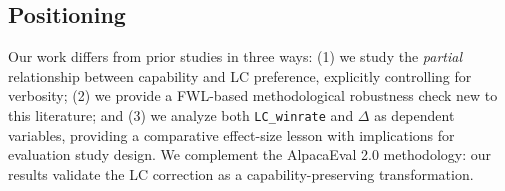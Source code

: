 \subsection{Positioning}

Our work differs from prior studies in three ways: (1) we study the \textit{partial}
relationship between capability and LC preference, explicitly controlling for verbosity;
(2) we provide a FWL-based methodological robustness check new to this literature; and
(3) we analyze both \texttt{LC\_winrate} and $\Delta$ as dependent variables, providing a
comparative effect-size lesson with implications for evaluation study design. We complement the
AlpacaEval 2.0 methodology: our results validate the LC correction as a
capability-preserving transformation.
